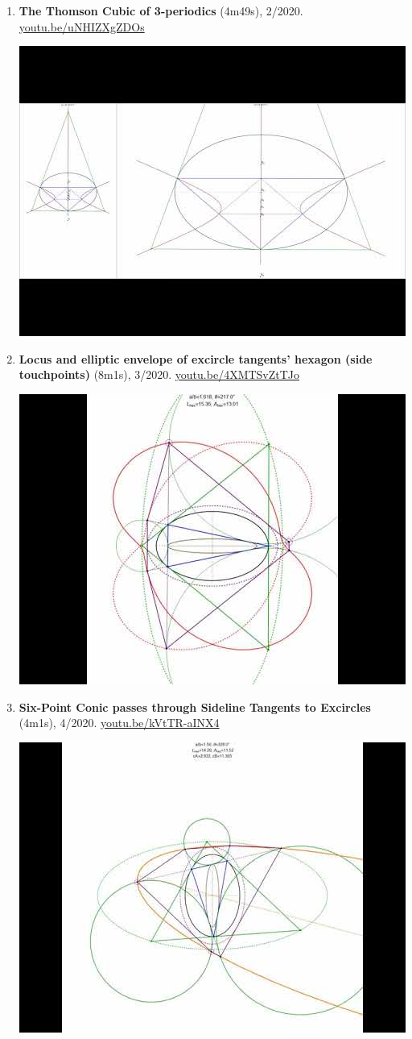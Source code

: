 \documentclass[12pt]{article}
\begin{document}
\begin{enumerate}[resume]
% 
\item \textbf{The Thomson Cubic of 3-periodics} (4m49s), 2/2020. \href{https://youtu.be/uNHIZXgZDOs}{\url{youtu.be/uNHIZXgZDOs}}
\begin{center}\includegraphics[width=.5\textwidth]{pics/uNHIZXgZDOs.jpg}\end{center}
% 
\item \textbf{Locus and elliptic envelope of excircle tangents' hexagon (side touchpoints)} (8m1s), 3/2020. \href{https://youtu.be/4XMTSvZtTJo}{\url{youtu.be/4XMTSvZtTJo}}
\begin{center}\includegraphics[width=.5\textwidth]{pics/4XMTSvZtTJo.jpg}\end{center}
% 
\item \textbf{Six-Point Conic passes through Sideline Tangents to Excircles} (4m1s), 4/2020. \href{https://youtu.be/kVtTR-aINX4}{\url{youtu.be/kVtTR-aINX4}}
\begin{center}\includegraphics[width=.5\textwidth]{pics/kVtTR-aINX4.jpg}\end{center}

\end{enumerate}
\end{document}
